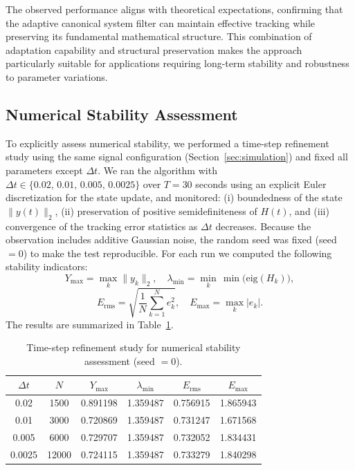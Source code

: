 \documentclass[reqno]{amsart}
\numberwithin{equation}{section}
\begin{document}
The observed performance aligns with theoretical expectations, confirming that the adaptive canonical system filter can maintain effective tracking while preserving its fundamental mathematical structure. This combination of adaptation capability and structural preservation makes the approach particularly suitable for applications requiring long-term stability and robustness to parameter variations.


\subsection*{Numerical Stability Assessment}

To explicitly assess numerical stability, we performed a time-step refinement study using the same signal configuration
(Section~\ref{sec:simulation}) and fixed all parameters except $\Delta t$.
We ran the algorithm with $\Delta t\in\{0.02,\,0.01,\,0.005,\,0.0025\}$ over $T=30$ seconds using an explicit Euler
discretization for the state update, and monitored:
(i) boundedness of the state $\|y(t)\|_2$, (ii) preservation of positive semidefiniteness of $H(t)$, and
(iii) convergence of the tracking error statistics as $\Delta t$ decreases.
Because the observation includes additive Gaussian noise, the random seed was fixed (seed $=0$) to make the test reproducible.
For each run we computed the following stability indicators:
\[
Y_{\max}=\max_{k}\|y_k\|_2,\quad
\lambda_{\min}=\min_{k}\,\min\bigl(\mathrm{eig}(H_k)\bigr),
\]
\[
E_{\mathrm{rms}}=\sqrt{\frac{1}{N}\sum_{k=1}^{N} e_k^2},\quad
E_{\max}=\max_{k}|e_k|.
\]
The results are summarized in Table~\ref{tab:dt_stability}.

\begin{table}[h!]
\centering
\caption{Time-step refinement study for numerical stability assessment (seed $=0$).}
\label{tab:dt_stability}
\begin{tabular}{c c c c c c}
\hline
$\Delta t$ & $N$ & $Y_{\max}$ & $\lambda_{\min}$ & $E_{\mathrm{rms}}$ & $E_{\max}$ \\
\hline
0.02   & 1500  & 0.891198 & 1.359487 & 0.756915 & 1.865943 \\
0.01   & 3000  & 0.720869 & 1.359487 & 0.731247 & 1.671568 \\
0.005  & 6000  & 0.729707 & 1.359487 & 0.732052 & 1.834431 \\
0.0025 & 12000 & 0.724115 & 1.359487 & 0.733279 & 1.840298 \\
\hline
\end{tabular}
\end{table}
\end{document}
